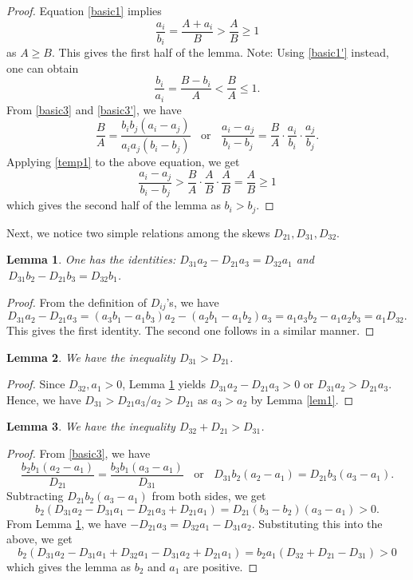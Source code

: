 \documentclass[12pt]{article}
\newtheorem{lem}{Lemma}
\begin{document}
\begin{proof}
Equation \eqref{basic1} implies
\begin{equation} \label{temp1}
\frac{a_i}{b_i} = \frac{A + a_i}{B} > \frac{A}{B} \ge 1
\end{equation}
as $A \ge B$. This gives the first half of the lemma. Note: Using \eqref{basic1'} instead, one can obtain
\begin{equation} \label{temp2}
\frac{b_i}{a_i} = \frac{B - b_i}{A} < \frac{B}{A} \le 1.
\end{equation}
From \eqref{basic3} and \eqref{basic3'}, we have
\[
\frac{B}{A} = \frac{b_i b_j (a_i - a_j)}{a_i a_j (b_i - b_j)} \; \; \text{ or } \; \; \frac{a_i - a_j}{b_i - b_j} = \frac{B}{A} \cdot \frac{a_i}{b_i} \cdot \frac{a_j}{b_j}.
\]
Applying \eqref{temp1} to the above equation, we get
\[
\frac{a_i - a_j}{b_i - b_j} > \frac{B}{A} \cdot \frac{A}{B} \cdot \frac{A}{B} = \frac{A}{B} \ge 1
\]
which gives the second half of the lemma as $b_i > b_j$.
\end{proof}

Next, we notice two simple relations among the skews $D_{21}, D_{31}, D_{32}$.
\begin{lem} \label{lem3}
One has the identities: $D_{31} a_2 - D_{21} a_3 = D_{32} a_1$ and $\, D_{31} b_2 - D_{21} b_3 = D_{32} b_1$.
\end{lem}
\begin{proof}
From the definition of $D_{ij}$'s, we have
\[
D_{31} a_2 - D_{21} a_3 = (a_3 b_1 - a_1 b_3) a_2 - (a_2 b_1 - a_1 b_2) a_3 =  a_1 a_3 b_2 - a_1 a_2 b_3 = a_1 D_{32}.
\]
This gives the first identity. The second one follows in a similar manner.
\end{proof}

\begin{lem} \label{lem4}
We have the inequality $D_{31} > D_{21}$.
\end{lem}
\begin{proof}
Since $D_{32}, a_1 > 0$, Lemma \ref{lem3} yields $D_{31} a_2 - D_{21} a_3 > 0$ or $D_{31} a_2 > D_{21} a_3$. Hence, we have $D_{31} > D_{21} a_3 / a_2 > D_{21}$ as $a_3 > a_2$ by Lemma \ref{lem1}.
\end{proof}

\begin{lem} \label{lem5}
We have the inequality $D_{32} + D_{21} > D_{31}$.    
\end{lem}
\begin{proof}
From \eqref{basic3}, we have
\[
\frac{b_2 b_1 (a_2 - a_1)}{D_{21}} = \frac{b_3 b_1 (a_3 - a_1)}{D_{31}} \; \; \text{ or } \; \; D_{31} b_2 (a_2 - a_1) = D_{21} b_3 (a_3 - a_1).
\]
Subtracting $D_{21} b_2 (a_3 - a_1)$ from both sides, we get
\[
b_2 (D_{31} a_2 - D_{31} a_1 - D_{21} a_3 + D_{21} a_1) = D_{21} (b_3 - b_2) (a_3 - a_1) > 0.
\]
From Lemma \ref{lem3}, we have $-D_{21} a_3 = D_{32} a_1 - D_{31} a_2$. Substituting this into the above, we get
\[
b_2 (D_{31} a_2 - D_{31} a_1 + D_{32} a_1 - D_{31} a_2 + D_{21} a_1) = b_2 a_1 (D_{32} + D_{21} - D_{31}) > 0
\]
which gives the lemma as $b_2$ and $a_1$ are positive. 
\end{proof}
\end{document}
